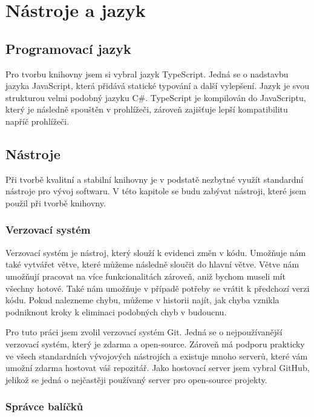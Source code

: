 \chapter{Nástroje a jazyk}
\section{Programovací jazyk}

Pro tvorbu knihovny jsem si vybral jazyk TypeScript. 
Jedná se o nadstavbu jazyka JavaScript, která přidává statické typování a další vylepšení. 
Jazyk je svou strukturou velmi podobný jazyku C\#.
TypeScript je kompilován do JavaScriptu, který je následně spouštěn v prohlížeči, zároveň zajišťuje lepší kompatibilitu napříč prohlížeči.

\section{Nástroje}

Při tvorbě kvalitní a stabilní knihovny je v podstatě nezbytné využít standardní nástroje pro vývoj softwaru. 
V této kapitole se budu zabývat nástroji, které jsem použil při tvorbě knihovny.

\subsection{Verzovací systém}

Verzovací systém je nástroj, který slouží k evidenci změn v kódu. 
Umožňuje nám také vytvářet větve, které můžeme následně sloučit do hlavní větve. 
Větve nám umožňují pracovat na více funkcionalitách zároveň, aniž bychom museli mít všechny hotové. 
Také nám umožňuje v případě potřeby se vrátit k předchozí verzi kódu.
 Pokud nalezneme chybu, můžeme v historii najít, jak chyba vznikla podniknout kroky k eliminaci podobných chyb v budoucnu.

Pro tuto práci jsem zvolil verzovací systém Git. Jedná se o nejpoužívanější verzovací systém, který je zdarma a open-source.
Zároveň má podporu prakticky ve všech standardních vývojových nástrojích a existuje mnoho serverů, které vám umožní zdarma hostovat váš repozitář.
Jako hostovací server jsem vybral GitHub, jelikož se jedná o nejčastěji používaný server pro open-source projekty.

\subsection{Správce balíčků}


